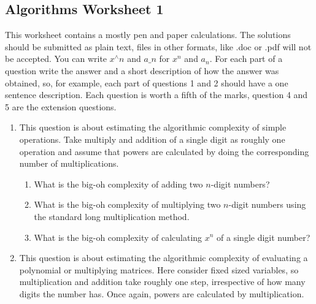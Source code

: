 \documentclass[11pt,a4paper]{scrartcl}
\begin{document}
\subsection*{Algorithms Worksheet 1}

This worksheet contains a mostly pen and paper calculations. The
solutions should be submitted as plain text, files in other formats,
like .doc or .pdf will not be accepted. You can write $x^\wedge n$ and
$a\_n$ for $x^n$ and $a_n$. For each part of a question write the
answer and a short description of how the answer was obtained, so, for
example, each part of questions 1 and 2 should have a one sentence
description. Each question is worth a fifth of the marks, question 4
and 5 are the extension questions.

\begin{enumerate}

\item This question is about estimating the algorithmic
  complexity of simple operations. Take multiply and addition of a
  single digit as roughly one operation and assume that powers are
  calculated by doing the corresponding number of multiplications.

\begin{enumerate}
\item What is the big-oh complexity of adding two $n$-digit numbers?
\item What is the big-oh complexity of multiplying two $n$-digit numbers
  using the standard long multiplication method.
\item What is the big-oh complexity of calculating $x^n$ of a single
  digit number?
\end{enumerate}


\item This question is about estimating the algorithmic complexity of
  evaluating a polynomial or multiplying matrices. Here consider fixed
  sized variables, so multiplication and addition take roughly one
  step, irrespective of how many digits the number has. Once again,
  powers are calculated by multiplication.


\end{enumerate}
\end{document}
